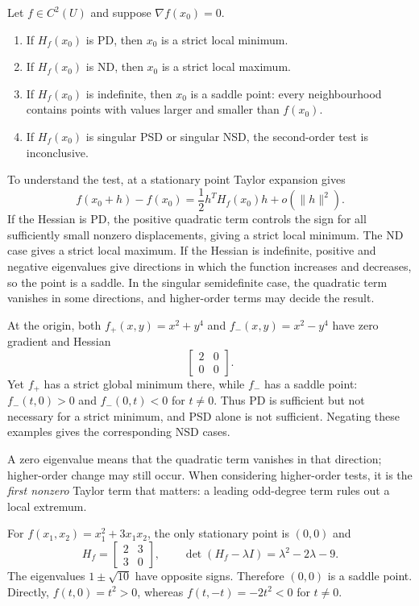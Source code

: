 \begin{theorem}
\label{thm:lec07-classification}
Let $f\in C^2(U)$ and suppose $\nabla f(x_0)=0$.
\begin{enumerate}
 \item If $H_f(x_0)$ is PD, then $x_0$ is a strict local minimum.
 \item If $H_f(x_0)$ is ND, then $x_0$ is a strict local maximum.
 \item If $H_f(x_0)$ is indefinite, then $x_0$ is a saddle point: every neighbourhood contains points with values larger and smaller than $f(x_0)$.
 \item If $H_f(x_0)$ is singular PSD or singular NSD, the second-order test is inconclusive.
\end{enumerate}
\end{theorem}
To understand the test, at a stationary point Taylor expansion gives
\[
 f(x_0+h)-f(x_0)=\frac12h^TH_f(x_0)h+o(\|h\|^2).
\]
If the Hessian is PD, the positive quadratic term controls the sign for all sufficiently small nonzero displacements, giving a strict local minimum. The ND case gives a strict local maximum. If the Hessian is indefinite, positive and negative eigenvalues give directions in which the function increases and decreases, so the point is a saddle. In the singular semidefinite case, the quadratic term vanishes in some directions, and higher-order terms may decide the result.

\begin{example}
At the origin, both $f_+(x,y)=x^2+y^4$ and $f_-(x,y)=x^2-y^4$ have zero gradient and Hessian
\[
 \begin{bmatrix}2&0\\0&0\end{bmatrix}.
\]
Yet $f_+$ has a strict global minimum there, while $f_-$ has a saddle point: $f_-(t,0)>0$ and $f_-(0,t)<0$ for $t\ne0$. Thus PD is sufficient but not necessary for a strict minimum, and PSD alone is not sufficient. Negating these examples gives the corresponding NSD cases.
\end{example}
A zero eigenvalue means that the quadratic term vanishes in that direction; higher-order change may still occur. When considering higher-order tests, it is the \emph{first nonzero} Taylor term that matters: a leading odd-degree term rules out a local extremum.

\begin{example}
For $f(x_1,x_2)=x_1^2+3x_1x_2$, the only stationary point is $(0,0)$ and
\[
 H_f=\begin{bmatrix}2&3\\3&0\end{bmatrix},
 \qquad \det(H_f-\lambda I)=\lambda^2-2\lambda-9.
\]
The eigenvalues $1\pm\sqrt{10}$ have opposite signs. Therefore $(0,0)$ is a saddle point. Directly, $f(t,0)=t^2>0$, whereas $f(t,-t)=-2t^2<0$ for $t\ne0$.
\end{example}

